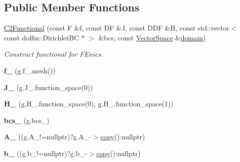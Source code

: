 \subsection*{\-Public \-Member \-Functions}
\begin{DoxyCompactItemize}
\item 
\hyperlink{classSpacy_1_1FEniCS_1_1C2Functional_a8f32c233a72dc3d25a656c1db12af943}{\-C2\-Functional} (const \-F \&f, const \-D\-F \&\-J, const \-D\-D\-F \&\-H, const std\-::vector$<$ const dolfin\-::\-Dirichlet\-B\-C $\ast$ $>$ \&bcs, const \hyperlink{classSpacy_1_1VectorSpace}{\-Vector\-Space} \&\hyperlink{classSpacy_1_1FunctionalBase_a2d3397deb9fa1ad85ed04e37a03b3aa6}{domain})
\begin{DoxyCompactList}\small\item\em \-Construct functional for \-F\-Enics. \end{DoxyCompactList}\item 
\hypertarget{classSpacy_1_1FEniCS_1_1C2Functional_ae44eeec6693a471cd8260c9b1558e6ac}{{\bfseries f\-\_\-} (g.\-f\-\_\-.\-mesh())}\label{classSpacy_1_1FEniCS_1_1C2Functional_ae44eeec6693a471cd8260c9b1558e6ac}

\item 
\hypertarget{classSpacy_1_1FEniCS_1_1C2Functional_abd4b55ea517767411d5b45382fcde0e5}{{\bfseries \-J\-\_\-} (g.\-J\-\_\-.\-function\-\_\-space(0))}\label{classSpacy_1_1FEniCS_1_1C2Functional_abd4b55ea517767411d5b45382fcde0e5}

\item 
\hypertarget{classSpacy_1_1FEniCS_1_1C2Functional_aa2176d5bfd5ce7b51e35d5ef67b6914a}{{\bfseries \-H\-\_\-} (g.\-H\-\_\-.\-function\-\_\-space(0), g.\-H\-\_\-.\-function\-\_\-space(1))}\label{classSpacy_1_1FEniCS_1_1C2Functional_aa2176d5bfd5ce7b51e35d5ef67b6914a}

\item 
\hypertarget{classSpacy_1_1FEniCS_1_1C2Functional_a550ecb19a100f9d3bbc6ae7f6da3bc1b}{{\bfseries bcs\-\_\-} (g.\-bcs\-\_\-)}\label{classSpacy_1_1FEniCS_1_1C2Functional_a550ecb19a100f9d3bbc6ae7f6da3bc1b}

\item 
\hypertarget{classSpacy_1_1FEniCS_1_1C2Functional_a616112f0a96db8990be066d8a871b57c}{{\bfseries \-A\-\_\-} ((g.\-A\-\_\-!=nullptr)?g.\-A\-\_\--\/$>$\hyperlink{group__FenicsGroup_ga7f43f0c660d0646adb031b453c536bb0}{copy}()\-:nullptr)}\label{classSpacy_1_1FEniCS_1_1C2Functional_a616112f0a96db8990be066d8a871b57c}

\item 
\hypertarget{classSpacy_1_1FEniCS_1_1C2Functional_a1ef2bc828d1d94b2a0dc58a39f9e208a}{{\bfseries b\-\_\-} ((g.\-b\-\_\-!=nullptr)?g.\-b\-\_\--\/$>$\hyperlink{group__FenicsGroup_ga7f43f0c660d0646adb031b453c536bb0}{copy}()\-:nullptr)}\label{classSpacy_1_1FEniCS_1_1C2Functional_a1ef2bc828d1d94b2a0dc58a39f9e208a}


\end{DoxyCompactItemize}
